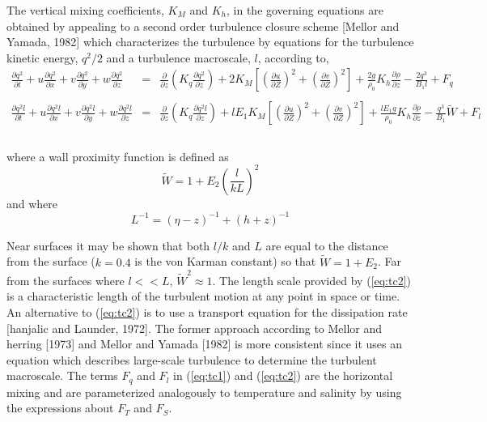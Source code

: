 \documentclass[oribibl]{llncs}
\begin{document}
The vertical mixing coefficients, $K_M$ and $K_h$, in the governing equations are obtained by appealing to a second order turbulence closure scheme [Mellor and Yamada, 1982] which characterizes the turbulence by equations for the turbulence kinetic energy, $q^2/2$ and a turbulence macroscale, $l$, according to,
\begin{eqnarray}
\frac{\partial q^2}{\partial t} + u\frac{\partial q^2}{\partial x} +v\frac{\partial q^2}{\partial y} + w\frac{\partial q^2}{\partial z}  &=& \frac{\partial}{\partial z} \left( K_q \frac{\partial q^2}{\partial z} \right)+2K_M\left[ \left( \frac{\partial u}{\partial Z}\right)^2 + \left( \frac{\partial v}{\partial Z}\right)^2 \right] + \frac{2g}{\rho_0}K_h\frac{\partial \rho}{\partial z} - \frac{2q^3}{B_1 l} + F_q \nonumber \\  \label{eq:tc1} \\   
\frac{\partial q^2 l}{\partial t} + u\frac{\partial q^2 l}{\partial x} +v\frac{\partial q^2 l}{\partial y} + w\frac{\partial q^2 l}{\partial z}   &=& \frac{\partial}{\partial z} \left( K_q \frac{\partial q^2 l}{\partial z} \right)+ l E_1 K_M\left[ \left( \frac{\partial u}{\partial Z}\right)^2 + \left( \frac{\partial v}{\partial Z}\right)^2 \right] + \frac{l E_1 g}{\rho_0}K_h\frac{\partial \rho}{\partial z} - \frac{q^3}{B_1} \widetilde{W} + F_l   \nonumber \\ \nonumber  \label{eq:tc2} \\ 
\end{eqnarray}

where a wall proximity function is defined as
\begin{equation}
\widetilde{W} = 1+E_2 \left( \frac{l}{kL} \right)^2
\end{equation}
and where
\begin{equation}
L^{-1} = (\eta-z)^{-1} + (h+z)^{-1}
\end{equation}

Near surfaces it may be shown that both $l/k$ and $L$ are equal to the distance from the surface ($k=0.4$ is the von Karman constant) so that $\widetilde{W}=1+E_2$. Far from the surfaces where $l << L$, $\widetilde{W}^2 \approx 1$. The length scale provided by (\ref{eq:tc2}) is a characteristic length of the turbulent motion at any point in space or time. An alternative to (\ref{eq:tc2}) is to use a transport equation for the dissipation rate [hanjalic and Launder, 1972]. The former approach according to Mellor and herring [1973] and Mellor and Yamada [1982] is more consistent since it uses an equation which describes large-scale turbulence to determine the turbulent macroscale. The terms $F_q$ and $F_l$ in  (\ref{eq:tc1}) and  (\ref{eq:tc2}) are the horizontal mixing and are parameterized analogously to temperature and salinity by using the expressions about $F_T$ and $F_S$.
\end{document}

